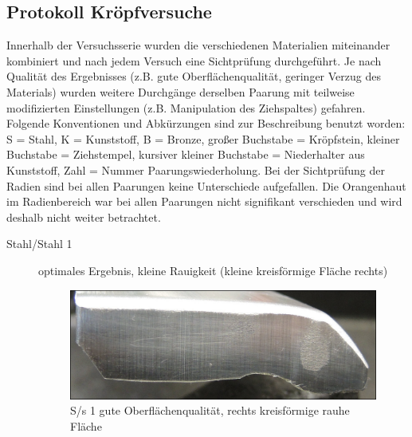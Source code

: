 \documentclass[12pt,a4paper,parskip,twoside,BCOR5mm,headsepline]{scrartcl}
\begin{document}
\begin{description*}
\subsection{Protokoll Kröpfversuche}
Innerhalb der Versuchsserie wurden die verschiedenen Materialien miteinander kombiniert und nach jedem Versuch eine Sichtprüfung durchgeführt. Je nach Qualität des Ergebnisses (z.B. gute Oberflächenqualität, geringer Verzug des Materials) wurden weitere Durchgänge derselben Paarung mit teilweise modifizierten Einstellungen (z.B. Manipulation des Ziehspaltes) gefahren. Folgende Konventionen und Abkürzungen sind zur Beschreibung benutzt worden: S = Stahl, K = Kunststoff, B = Bronze, großer Buchstabe = Kröpfstein, kleiner Buchstabe = Ziehstempel, kursiver kleiner Buchstabe = Niederhalter aus Kunststoff, Zahl = Nummer Paarungswiederholung. Bei der Sichtprüfung der Radien sind bei allen Paarungen keine Unterschiede aufgefallen. Die Orangenhaut im Radienbereich war bei allen Paarungen nicht signifikant verschieden und wird deshalb nicht weiter betrachtet.

\begin{description}
\item[Stahl/Stahl 1] optimales Ergebnis, kleine Rauigkeit (kleine kreisförmige Fläche rechts)
\begin{figure}[H]
\centering
\includegraphics[width=.8\textwidth]{Ss1a}
\caption{S/s 1 gute Oberflächenqualität, rechts kreisförmige rauhe Fläche}
\label{fig:ss1a}
\end{figure}


\end{description}
\end{description*}
\end{document}
